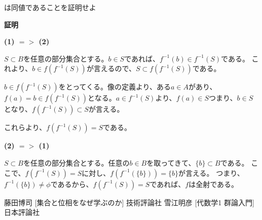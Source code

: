 \documentclass[dvipdfmx,autodetect-engine]{jsarticle}
\begin{document}
は同値であることを証明せよ

{\bf 証明}

{\bf (1) $ => $ (2)}

$S \subset B$を任意の部分集合とする。$b \in S$であれば、$f^{-1}(b) \in f^{-1}(S)$である。
これより、$b \in f(f^{-1}(S))$が言えるので、$S \subset f(f^{-1}(S))$である。

$b \in f(f^{-1}(S))$をとってくる。像の定義より、ある$a \in A$があり、$f(a) = b \in f(f^{-1}(S))$となる。$a \in f^{-1}(S)$より、$f(a) \in S$つまり、$b \in S$となり、$f(f^{-1}(S)) \subset S$が言える。

これらより、$f(f^{-1}(S)) = S$である。

{\bf (2) $ => $ (1)}

$S \subset B$を任意の部分集合とする。任意の$b \in B$を取ってきて、$\{b\} \subset B$である。
ここで、$f(f^{-1}(S)) = S$に対し、$f(f^{-1}(\{b\})) = \{b\}$が言える。
つまり、$f^{-1}(\{b\}) \neq \phi$であるから、$f(f^{-1}(S)) = S$であれば、$f$は全射である。


\begin{thebibliography}{n}
 藤田博司 [集合と位相をなぜ学ぶのか] 技術評論社
 雪江明彦 [代数学1 群論入門] 日本評論社
\end{thebibliography}
\end{document}
